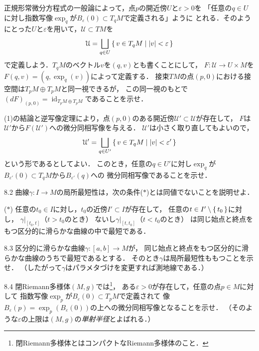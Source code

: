 \documentclass[uplatex,dvipdfmx,fontsize=12pt,jafontsize=11pt,line_length=42zw,number_of_lines=36,hanging_punctuation]{jlreq}
\newcommand{\abs}[1]{\lvert#1\rvert}
\DeclareMathOperator{\id}{id}
\begin{document}
\begin{enumerate-problems}
		\begin{enumerate-subproblems}
			\item
				正規形常微分方程式の一般論によって，点$p$の開近傍$U$と$\varepsilon>0$を
				「任意の$q\in U$に対し指数写像$\exp_q$が$B_\varepsilon(0)\subset T_qM$で定義される」ように
				とれる．そのようにとった$U$と$\varepsilon$を用いて，$\mathcal{U}\subset TM$を
				\begin{equation}
					\mathcal{U}=\bigsqcup_{q\in U}\set{v\in T_qM|\abs{v}<\varepsilon}
				\end{equation}
				で定義しよう．$T_qM$のベクトル$v$を$(q,v)$とも書くことにして，
				$F\colon\mathcal{U}\to U\times M$を$F(q,v)=(q,\exp_q(v))$によって定義する．
				接束$TM$の点$(p,0)$における接空間は$T_pM\oplus T_pM$と同一視できるが，
				この同一視のもとで
				$(dF)_{(p,0)}=\id_{T_pM\oplus T_pM}$であることを示せ．
			\item
				(1)の結論と逆写像定理により，点$(p,0)$のある開近傍$\mathcal{U}'\subset\mathcal{U}$が存在して，
				$F$は$\mathcal{U}'$から$F(\mathcal{U}')$への微分同相写像を与える．
				$\mathcal{U}'$は小さく取り直してもよいので，
				\begin{equation}
					\mathcal{U}'=\bigsqcup_{q\in U'}\set{v\in T_qM|\abs{v}<\varepsilon'}
				\end{equation}
				という形であるとしてよい．
				このとき，任意の$q\in U'$に対し$\exp_q$が
				$B_{\varepsilon'}(0)\subset T_qM$から$B_{\varepsilon'}(q)$への
				微分同相写像であることを示せ．
		\end{enumerate-subproblems}
	\item[8.2]
		曲線$\gamma\colon I\to M$の局所最短性は，次の条件($*$)とは同値でないことを説明せよ．
		\begin{enumerate-conditions}
			\item[($*$)]
				任意の$t_0\in I$に対し，$t_0$の近傍$I'\subset I$が存在して，
				任意の$t\in I'\setminus\set{t_0}$に対し，
				$\gamma|_{[t_0,t]}$（$t>t_0$のとき）
				ないし$\gamma|_{[t,t_0]}$（$t<t_0$のとき）
				は同じ始点と終点をもつ区分的に滑らかな曲線の中で最短である．
		\end{enumerate-conditions}
	\item[8.3]
		区分的に滑らかな曲線$\gamma\colon[a,b]\to M$が，
		同じ始点と終点をもつ区分的に滑らかな曲線のうちで最短であるとする．
		そのとき$\gamma$は局所最短性ももつことを示せ．
		（したがって$\gamma$はパラメタづけを変更すれば測地線である．）
	\item[8.4]
		閉Riemann多様体$(M,g)$では\footnote{閉Riemann多様体とはコンパクトなRiemann多様体のこと．}，
		ある$\varepsilon>0$が存在して，任意の点$p\in M$に対して
		指数写像$\exp_p$が$B_\varepsilon(0)\subset T_pM$で定義されて
		像$B_\varepsilon(p)=\exp_p(B_\varepsilon(0))$の上への微分同相写像となることを示せ．
		（そのような$\varepsilon$の上限は$(M,g)$の\emph{単射半径}とよばれる．）
\end{enumerate-problems}
\end{document}
